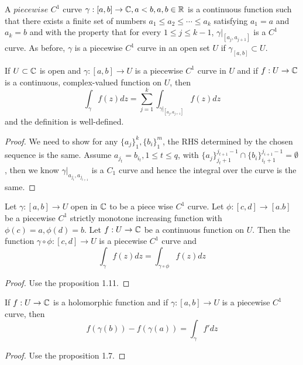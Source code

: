 \begin{definition}
    A $piecewise$ $C^1$ curve $\gamma:[a,b]\to\mathbb{C}, a<b,a,b\in\mathbb{R}$ is a continuous function such that there exists a finite set of numbers $a_1\leq a_2 \leq \cdots \leq a_k$ satisfying $a_1=a$ and $a_k=b$ and with the property that for every $1\leq j \leq k-1$, $\gamma|_{[a_j,a_{j+1}]}$ is a $C^1$ curve. As before, $\gamma$ is a piecewise $C^1$ curve in an open set $U$ if $\gamma_{[a,b]}\subset U$.
\end{definition}

\begin{definition}
    If $U\subset \mathbb{C}$ is open and $\gamma:[a,b]\to U$ is a piecewise $C^1$ curve in $U$ and if $f:U\to\mathbb{C}$ is a continuous, complex-valued function on $U$, then
    \[
    \int_{\gamma} f(z)dz = \sum\limits_{j=1}^k \int_{\gamma|_{[a_j,a_{j+1}]}} f(z)dz
    \]
    and the definition is well-defined.
\end{definition}
\begin{proof}\par
    We need to show for any $\{a_j\}_1^k,\{b_i\}_1^m$, the RHS determined by the chosen sequence is the same. Assume $a_{j_t} = b_{i_t}, 1\leq t \leq q$, with $\{a_j\}_{j_t+1}^{j_{t+1}-1} \cap \{b_i\}_{i_t+1}^{j_{i+1}-1} = \emptyset$, then we know $\gamma|_{a_{j_t},a_{j_{t+1}}}$ is a $C_1$ curve and hence the integral over the curve is the same.
\end{proof}

\begin{lemma}
    Let $\gamma:[a,b]\to U$ open in $\mathbb{C}$ to be a piece wise $C^1$ curve. Let $\phi:[c,d]\to [a.b]$ be a piecewise $C^1$ strictly monotone increasing function with $\phi(c) = a, \phi(d) = b$. Let $f:U\to \mathbb{C}$ be a continuous function on $U$. Then the function $\gamma\circ \phi:[c,d]\to U$ is a piecewise $C^1$ curve and
    \[
        \int_{\gamma} f(z)dz = \int_{\gamma\circ\phi} f(z)dz
    \]
\end{lemma}
\begin{proof}
    Use the proposition 1.11.
\end{proof}

\begin{lemma}
If $f:U\to \mathbb{C}$ is a holomorphic function and if $\gamma:[a,b]\to U$ is a piecewise $C^1$ curve, then
\[f(\gamma(b))-f(\gamma(a)) = \int_{\gamma} f'dz\]
\end{lemma}
\begin{proof}
    Use the proposition 1.7.
\end{proof}

